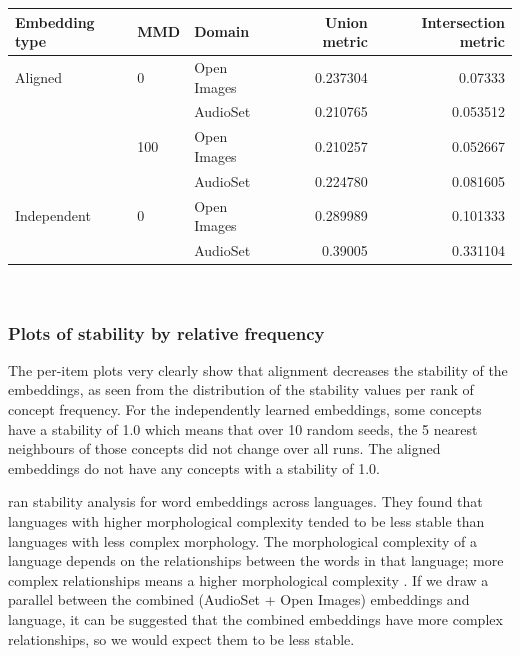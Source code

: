 \begin{table}[H]
\centering
\begin{tabular}{lllrr}
\toprule
Embedding type  & MMD    & Domain          & Union metric & Intersection metric         \\
\midrule
Aligned & 0   & Open Images &  0.237304 & 0.07333\\
            &     & AudioSet &  0.210765 & 0.053512\\
            & 100 & Open Images &  0.210257 & 0.052667\\
                   &     & AudioSet &  0.224780 & 0.081605\\
Independent & 0   & Open Images &  0.289989 & 0.101333 \\
                   &     & AudioSet &  0.39005 & 0.331104 \\
\bottomrule
\end{tabular}\\
\end{table}

\subsubsection{Plots of stability by relative frequency}

The per-item plots very clearly show that alignment decreases the stability of the embeddings, as seen from the distribution of the stability values per rank of concept frequency. For the independently learned embeddings, some concepts have a stability of 1.0 which means that over 10 random seeds, the 5 nearest neighbours of those concepts did not change over all runs. The aligned embeddings do not have any concepts with a stability of 1.0. 

\cite{WordEmbeddingStability} ran stability analysis for word embeddings across languages. They found that languages with higher morphological complexity tended to be less stable than languages with less complex morphology. The morphological complexity of a language depends on the relationships between the words in that language; more complex relationships means a higher morphological complexity \cite{MorphologicalComplexity}. If we draw a parallel between the combined (AudioSet + Open Images) embeddings and language, it can be suggested that the combined embeddings have more complex relationships, so we would expect them to be less stable. 

